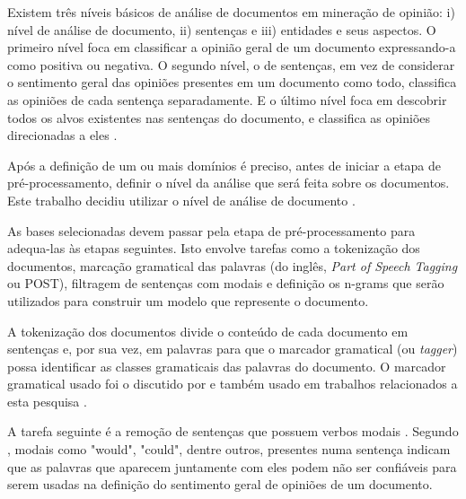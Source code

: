 Existem três níveis básicos de análise de documentos em mineração de opinião: i) nível de análise de documento, ii) sentenças e iii) entidades e seus aspectos. O primeiro nível foca em classificar a opinião geral de um documento expressando-a como positiva ou negativa. O segundo nível, o de sentenças, em vez de considerar o sentimento geral das opiniões presentes em um documento como todo, classifica as opiniões de cada sentença separadamente. E o último nível foca em descobrir todos os alvos existentes nas sentenças do documento, e classifica as opiniões direcionadas a eles \cite{bing:2012}. 

Após a definição de um ou mais domínios é preciso, antes de iniciar a etapa de pré-processamento, definir o nível da análise que será feita sobre os documentos. Este trabalho decidiu utilizar o nível de análise de documento  \cite{joachims1998text, pang2002thumbs, gamon2004sentiment, mullen2004sentiment, pang2004sentimental, cui2006comparative}. 

As bases selecionadas devem passar pela etapa de pré-processamento para adequa-las às etapas seguintes. Isto envolve tarefas como    a tokenização dos documentos, marcação gramatical das palavras (do inglês, \textit{Part of Speech Tagging} ou POST), filtragem de sentenças com modais e definição os n-grams que serão utilizados para construir um modelo que represente o documento. 

A tokenização dos documentos divide o conteúdo de cada documento em sentenças e, por sua vez, em palavras para que o marcador gramatical (ou \textit{tagger}) possa identificar as classes gramaticais das palavras do documento. O marcador gramatical usado foi o discutido   por  e também usado em trabalhos relacionados a esta pesquisa \cite{chaovalit2005movie, taboada2008extracting, taboada2011lexicon}. 

A tarefa seguinte é a remoção de sentenças que possuem verbos modais . Segundo , modais como "would", "could", dentre outros, presentes numa sentença indicam que as palavras que aparecem juntamente com eles podem não ser confiáveis para serem usadas na definição do sentimento geral de opiniões de um documento. 

